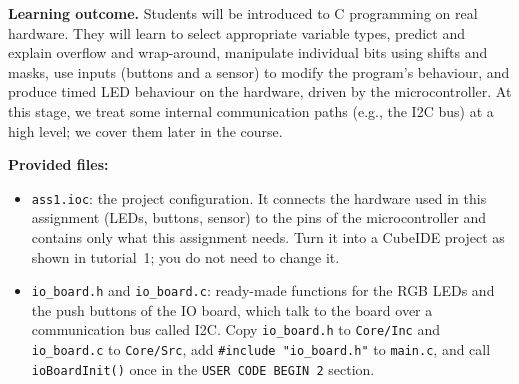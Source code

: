 \documentclass[11pt,a4paper]{article}
\begin{document}
\textbf{Learning outcome.} Students will be introduced to C programming on real hardware. They will learn to select
appropriate variable types, predict and explain overflow and wrap-around, manipulate individual bits using shifts and
masks, use inputs (buttons and a sensor) to modify the program's behaviour, and produce timed LED behaviour on the
hardware, driven by the microcontroller. At this stage, we treat some internal communication paths (e.g., the I2C
bus) at a high level; we cover them later in the course.

\medskip\noindent
\textbf{Provided files:}
\begin{itemize}
\item \texttt{ass1.ioc}: the project configuration. It connects the hardware used in this assignment (LEDs, buttons,
      sensor) to the pins of the microcontroller and contains only what this assignment needs. Turn it into a
      CubeIDE project as shown in tutorial~1; you do not need to change it.
\item \texttt{io\_board.h} and \texttt{io\_board.c}: ready-made functions for the RGB LEDs and the push buttons of the
      IO board, which talk to the board over a communication bus called I2C. Copy \texttt{io\_board.h} to
      \texttt{Core/Inc} and \texttt{io\_board.c} to \texttt{Core/Src}, add \texttt{\#include "io\_board.h"} to
      \texttt{main.c}, and call \texttt{ioBoardInit()} once in the \texttt{USER CODE BEGIN 2} section.
\end{itemize}
\end{document}
